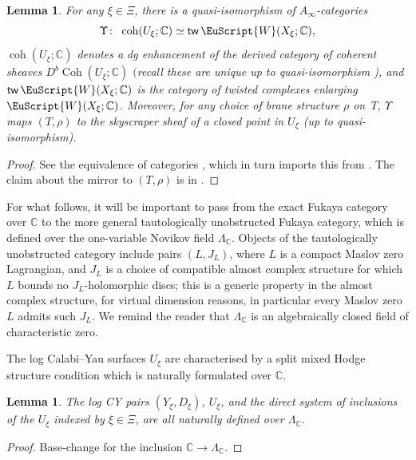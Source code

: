 \documentclass[pdftex]{sigma}
\newcommand {\Coh} {\operatorname{Coh}}
\newcommand {\ccoh} {\operatorname{coh}}
\def\scrW{\EuScript{W}}
\def\bC{\mathbb{C}}
\newtheorem{lem}[thm]{Lemma}
\theoremstyle{definition}
\DeclareMathOperator{\tw}{\mathsf{tw}}
\numberwithin{equation}{section}
\begin{document}
 \begin{lem} \label{lem:torus-mirror-over-C}
 For any $\xi \in \Xi$, there is a quasi-isomorphism of $A_\infty$-categories
\begin{equation*}
 \Upsilon\colon \ \ccoh(U_{\xi};\bC) \simeq \tw \scrW(X_{\xi};\bC),
\end{equation*}
$\ccoh (U_\xi; \bC)$ denotes a dg enhancement of the derived category of coherent sheaves $D^b \Coh (U_\xi; \bC)$ $($recall these are unique up to quasi-isomorphism {\rm \cite{Lunts-Orlov})}, and $\tw \scrW(X_{\xi};\bC)$ is the category of twisted complexes enlarging $\scrW(X_{\xi};\bC)$.
 Moreover, for any choice of brane structure $\rho$ on~$T$,
 $\Upsilon$ maps $(T, \rho)$ to the skyscraper sheaf of a closed point in $U_\xi$ (up to quasi-isomorphism).
 \end{lem}


\begin{proof} See the equivalence of categories \cite[Section 2.3]{Keating-Ward}, which in turn imports this from \cite{Hacking-Keating-1}.
The claim about the mirror to $(T, \rho)$ is in \cite[Lemma 2.24]{Hacking-Keating-3}.
\end{proof}

For what follows, it will be important to pass from the exact Fukaya category over $\bC$ to the more general tautologically unobstructed Fukaya category, which is defined over the one-variable Novikov field $\Lambda_{\bC}$. Objects of the tautologically unobstructed category include pairs $(L,J_L)$, where $L$ is a compact Maslov zero Lagrangian, and $J_L$ is a choice of compatible almost complex structure for which $L$ bounds no $J_L$-holomorphic discs; this is a generic property in the almost complex structure, for virtual dimension reasons, in particular every Maslov zero $L$ admits such $J_L$.
We remind the reader that $\Lambda_{\bC}$ is an algebraically closed field of characteristic zero.

The log Calabi--Yau surfaces $U_\xi$ are characterised by a split mixed Hodge structure condition which is naturally formulated over $\bC$.
\begin{lem}
 The log CY pairs $(Y_\xi, D_\xi)$, $U_\xi$, and the direct system of inclusions of the $U_\xi$ indexed by $\xi \in \Xi$, are all naturally defined over $\Lambda_{\bC}$.
\end{lem}

\begin{proof} Base-change for the inclusion $\bC \to \Lambda_{\bC}$.
\end{proof}
\end{document}
